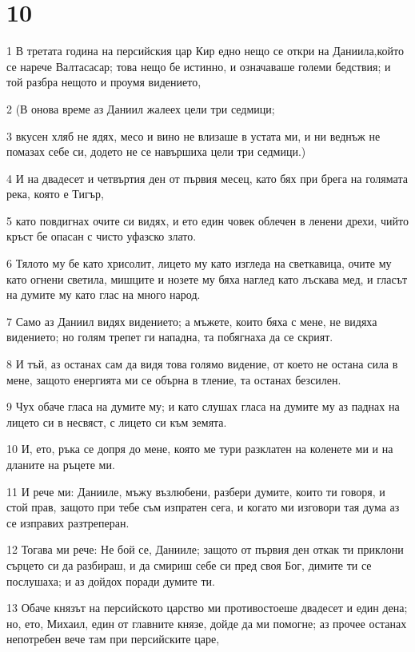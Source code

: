 \chapter{10}

\par 1 В третата година на персийския цар Кир едно нещо се откри на Даниила,който се нарече Валтасасар; това нещо бе истинно, и означаваше големи бедствия; и той разбра нещото и проумя видението,
\par 2 (В онова време аз Даниил жалеех цели три седмици;
\par 3 вкусен хляб не ядях, месо и вино не влизаше в устата ми, и ни веднъж не помазах себе си, додето не се навършиха цели три седмици.)
\par 4 И на двадесет и четвъртия ден от първия месец, като бях при брега на голямата река, която е Тигър,
\par 5 като повдигнах очите си видях, и ето един човек облечен в ленени дрехи, чийто кръст бе опасан с чисто уфазско злато.
\par 6 Тялото му бе като хрисолит, лицето му като изгледа на светкавица, очите му като огнени светила, мишците и нозете му бяха наглед като лъскава мед, и гласът на думите му като глас на много народ.
\par 7 Само аз Даниил видях видението; а мъжете, които бяха с мене, не видяха видението; но голям трепет ги нападна, та побягнаха да се скрият.
\par 8 И тъй, аз останах сам да видя това голямо видение, от което не остана сила в мене, защото енергията ми се обърна в тление, та останах безсилен.
\par 9 Чух обаче гласа на думите му; и като слушах гласа на думите му аз паднах на лицето си в несвяст, с лицето си към земята.
\par 10 И, ето, ръка се допря до мене, която ме тури разклатен на коленете ми и на дланите на ръцете ми.
\par 11 И рече ми: Данииле, мъжу възлюбени, разбери думите, които ти говоря, и стой прав, защото при тебе съм изпратен сега, и когато ми изговори тая дума аз  се изправих разтреперан.
\par 12 Тогава ми рече: Не бой се, Данииле; защото от първия ден откак ти приклони сърцето си да разбираш, и да смириш себе си пред своя Бог, димите ти се послушаха; и аз дойдох поради думите ти.
\par 13 Обаче князът на персийското царство ми противостоеше двадесет и един дена; но, ето, Михаил, един от главните князе, дойде да ми помогне; аз прочее останах непотребен вече там при персийските царе,

